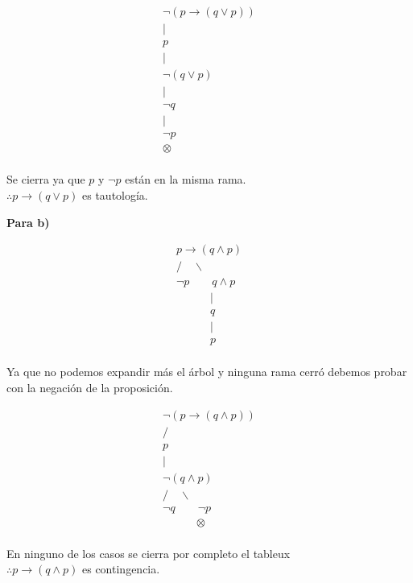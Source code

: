 \begin{center}
\[
\begin{array}{c}
\neg(p \rightarrow (q \lor p))\\
|\\
p\\
|\\
\neg (q \lor p)\\
|\\
\neg q \\
|\\
\neg p\\
\otimes\\
\end{array}
\]
\end{center}
Se cierra ya que $p$ y $\neg p$ están en la misma rama.\\
$\therefore p \rightarrow (q \lor p)$ es tautología. \\
\newline

\textbf{Para b)}
\begin{center}
\[
\begin{array}{c}
p \rightarrow (q \land p)\\
/ \quad \backslash\\
\neg p \quad \quad q\land p\\
\quad \quad \quad  | \\
\quad \quad \quad  q \\
\quad \quad \quad  | \\
\quad \quad \quad  p \\
\end{array}
\]
\end{center}
Ya que no podemos expandir más el árbol y ninguna rama cerró debemos probar con la negación de la proposición.
\begin{center}
\[
\begin{array}{c}
\neg(p \rightarrow (q \land p))\\
/ \\
p \\
| \\
\neg(q \land p)\\
/ \quad \backslash \\
\neg q \quad \quad \neg p \\
\quad \quad \quad \otimes \\
\end{array}
\]
\end{center}
En ninguno de los casos se cierra por completo el tableux\\
$\therefore p \rightarrow (q \land p)$ es contingencia.\\
\newline

